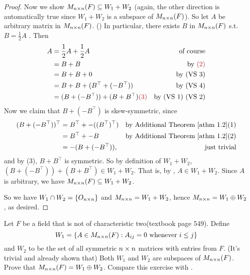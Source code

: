 \begin{proof}
Now we show \(M_{n \times n}(F) \subseteq W_1 + W_2\) (again, the other direction is automatically true since \(W_1 + W_2\) is a subspace of \(M_{n \times n}(F)\)).
So let \(A\) be arbitrary matrix in \(M_{n \times n}(F)\).
()
In particular, there exists \(B\) in \(M_{n \times n}(F)\) s.t. \(B = \frac1{2} A\) .
Then
\begin{align*}
    A & = \frac1{2} A + \frac1{2} A & \text{of course} \\
      & = B + B & \text{by \MAROON{(2)}} \\
      & = B + B + 0 & \text{by (VS 3)} \\
      & = B + B + (B^\top + (-B^\top)) & \text{by (VS 4)} \\
      & = (B + (-B^\top)) + (B + B^\top) \MAROON{(3)}  & \text{by (VS 1) (VS 2)}
\end{align*}
Now we claim that \(B + (-B^\top)\) is skew-symmetric, since
\begin{align*}
    (B + (-B^\top))^\top & = B^\top + -((B^\top)^\top) & \text{by \ATHM{1.2}(1)} \\
                   & = B^\top + -B & \text{by \ATHM{1.2}(2)} \\
                   & = -(B + (-B^\top)), & \text{just trivial}
\end{align*}
and by (3), \(B + B^\top\) is symmetric.
So by definition of \(W_1 + W_2\), \((B + (-B^\top)) + (B + B^\top) \in W_1 + W_2\).
That is, by , \(A \in W_1 + W_2\).
Since \(A\) is arbitrary, we have \(M_{n \times n}(F) \subseteq W_1 + W_2\).

So we have \(W_1 \cap W_2 = \{ O_{n \times n} \}\) and \(M_{n \times n} = W_1 + W_2\), hence \(M_{n \times n} = W_1 \oplus W_2\), as desired.
\end{proof}

\begin{exercise} \label{exercise 1.3.29}
Let \(F\) be a field that is not of characteristic two(textbook page 549).
Define
\[
    W_1 = \{ A \in M_{n \times n}(F) : A_{ij} = 0 \text{ whenever } i \le j \}
\]
and \(W_2\) to be the set of all symmetric \(n \times n\) matrices with entries from \(F\).
(It's trivial and already shown that) Both \(W_1\) and \(W_2\) are subspaces of \(M_{n \times n}(F)\).
Prove that \(M_{n \times n}(F) = W_1 \oplus W_2\).
Compare this exercise with .
\end{exercise}

